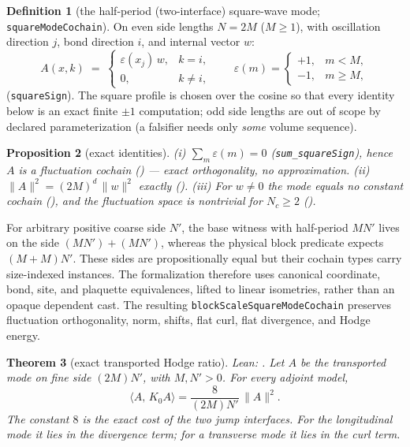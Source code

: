 \documentclass[11pt]{article}
\newtheorem{theorem}{Theorem}[section]
\newtheorem{proposition}[theorem]{Proposition}
\theoremstyle{definition}
\newtheorem{definition}[theorem]{Definition}
\newcommand{\lean}[1]{\texttt{#1}}
\newcommand{\inn}[2]{\langle #1,\, #2\rangle}
\begin{document}
\begin{definition}[the half-period (two-interface) square-wave mode;
\lean{squareModeCochain}]
On even side lengths $N=2M$ ($M\ge1$), with oscillation direction $j$,
bond direction $i$, and internal vector $w$:
\[
A(x,k) \;=\;
\begin{cases}
\varepsilon(x_j)\, w, & k=i,\\[2pt]
0, & k\neq i,
\end{cases}
\qquad
\varepsilon(m)=\begin{cases}+1,& m<M,\\ -1,& m\ge M,\end{cases}
\]
(\lean{squareSign}).  The square profile is chosen over the cosine so
that every identity below is an exact finite $\pm1$ computation; odd
side lengths are out of scope by declared parameterization (a falsifier
needs only \emph{some} volume sequence).
\end{definition}

\begin{proposition}[exact identities]
\raggedright
\emph{(i)} $\sum_m \varepsilon(m) = 0$ (\lean{sum\_squareSign}), hence
$A$ is a fluctuation cochain
() --- exact orthogonality, no
approximation.
\emph{(ii)} $\|A\|^2 = (2M)^d\,\|w\|^2$ exactly
().
\emph{(iii)} For $w\neq0$ the mode equals no constant cochain
(), and the fluctuation space is
nontrivial for $N_c\ge2$ ().
\end{proposition}

For arbitrary positive coarse side $N'$, the base witness with
half-period $MN'$ lives on the side
$(MN')+(MN')$, whereas the physical block predicate expects
$(M+M)N'$.  These sides are propositionally equal but their cochain types
carry size-indexed instances.  The formalization therefore uses canonical
coordinate, bond, site, and plaquette equivalences, lifted to linear
isometries, rather than an opaque dependent cast.  The resulting
\lean{blockScaleSquareModeCochain} preserves fluctuation orthogonality,
norm, shifts, flat curl, flat divergence, and Hodge energy.

\begin{theorem}[exact transported Hodge ratio]
\label{thm:hodge2}
\emph{Lean:}
.
Let $A$ be the transported mode on fine side $(2M)N'$, with $M,N'>0$.
For every adjoint model,
\begin{equation}\label{eq:hodge2}
 \inn{A}{K_0A}
 = \frac{8}{(2M)N'}\,\|A\|^2.
\end{equation}
The constant $8$ is the exact cost of the two jump interfaces.  For the
longitudinal mode it lies in the divergence term; for a transverse mode
it lies in the curl term.
\end{theorem}
\end{document}
